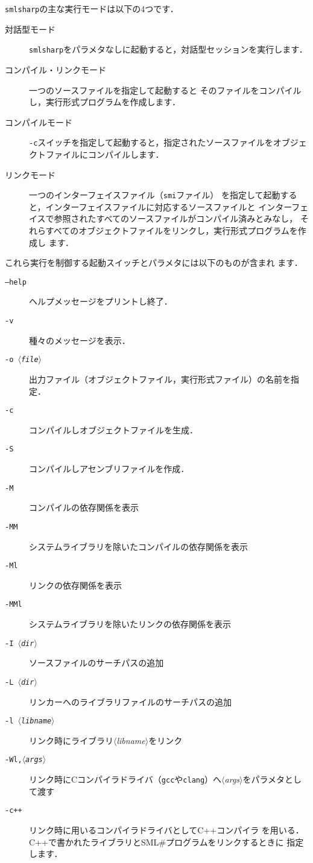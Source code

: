 \documentclass{jbook}
\newcommand{\smlsharp}{SML\#}
\newcommand{\nonterm}[1]{\mbox{$\langle$}{\it #1}\mbox{$\rangle$}}
\begin{document}
\ifjp%
	{\tt smlsharp}の主な実行モードは以下の4つです．
\begin{description}
\item[対話型モード]
{\tt smlsharp}をパラメタなしに起動すると，対話型セッションを実行します．
\item[コンパイル・リンクモード]
一つのソースファイルを指定して起動すると
そのファイルをコンパイルし，実行形式プログラムを作成します．
\item[コンパイルモード]
{\tt -c}スイッチを指定して起動すると，指定されたソースファイルをオブジェ
クトファイルにコンパイルします．
\item[リンクモード]
一つのインターフェイスファイル（{\tt smi}ファイル）
を指定して起動すると，インターフェイスファイルに対応するソースファイルと
インターフェイスで参照されたすべてのソースファイルがコンパイル済みとみなし，
それらすべてのオブジェクトファイルをリンクし，実行形式プログラムを作成し
ます．
\end{description}
	これら実行を制御する起動スイッチとパラメタには以下のものが含まれ
ます．
\begin{description}
\item[{\tt --help}] ヘルプメッセージをプリントし終了．
\item[{\tt -v}] 種々のメッセージを表示．
\item[{\tt -o \nonterm{file}}] 出力ファイル（オブジェクトファイル，実行形式ファイル）の名前を指定．
\item[{\tt -c}]  コンパイルしオブジェクトファイルを生成．
\item[{\tt -S}]  コンパイルしアセンブリファイルを作成．
\item[{\tt -M}] コンパイルの依存関係を表示
\item[{\tt -MM}] システムライブラリを除いたコンパイルの依存関係を表示
\item[{\tt -Ml}] リンクの依存関係を表示
\item[{\tt -MMl}] システムライブラリを除いたリンクの依存関係を表示
\item[{\tt -I \nonterm{dir}}] ソースファイルのサーチパスの追加
\item[{\tt -L \nonterm{dir}}] リンカーへのライブラリファイルのサーチパスの追加
\item[{\tt -l \nonterm{libname}}] リンク時にライブラリ\nonterm{libname}をリンク
\item[{\tt -Wl,\nonterm{args}}]  リンク時にCコンパイラドライバ（{\tt gcc}や{\tt clang}）へ\nonterm{args}をパラメタとして渡す
\item[{\tt -c++}] リンク時に用いるコンパイラドライバとしてC++コンパイラ
を用いる．
C++で書かれたライブラリと\smlsharp{}プログラムをリンクするときに
指定します．
\end{description}
\end{document}
